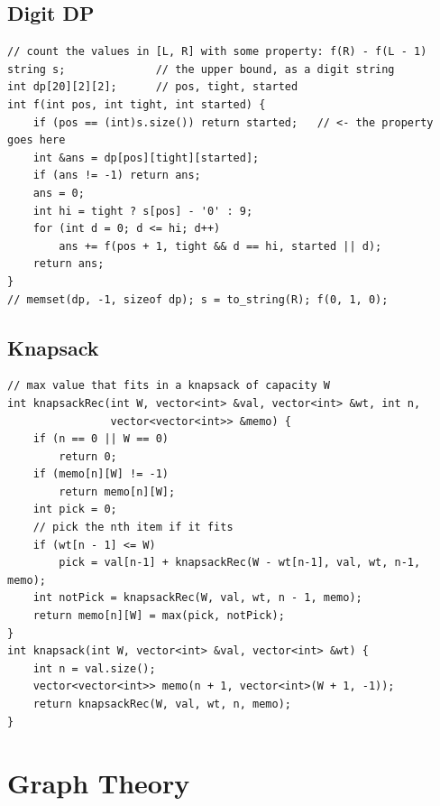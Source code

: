 \subsection{Digit DP}
\begin{lstlisting}
// count the values in [L, R] with some property: f(R) - f(L - 1)
string s;              // the upper bound, as a digit string
int dp[20][2][2];      // pos, tight, started
int f(int pos, int tight, int started) {
    if (pos == (int)s.size()) return started;   // <- the property goes here
    int &ans = dp[pos][tight][started];
    if (ans != -1) return ans;
    ans = 0;
    int hi = tight ? s[pos] - '0' : 9;
    for (int d = 0; d <= hi; d++)
        ans += f(pos + 1, tight && d == hi, started || d);
    return ans;
}
// memset(dp, -1, sizeof dp); s = to_string(R); f(0, 1, 0);
\end{lstlisting}
\subsection{Knapsack}
\begin{lstlisting}
// max value that fits in a knapsack of capacity W
int knapsackRec(int W, vector<int> &val, vector<int> &wt, int n,
                vector<vector<int>> &memo) {
    if (n == 0 || W == 0)
        return 0;
    if (memo[n][W] != -1)
        return memo[n][W];
    int pick = 0;
    // pick the nth item if it fits
    if (wt[n - 1] <= W)
        pick = val[n-1] + knapsackRec(W - wt[n-1], val, wt, n-1, memo);
    int notPick = knapsackRec(W, val, wt, n - 1, memo);
    return memo[n][W] = max(pick, notPick);
}
int knapsack(int W, vector<int> &val, vector<int> &wt) {
    int n = val.size();
    vector<vector<int>> memo(n + 1, vector<int>(W + 1, -1));
    return knapsackRec(W, val, wt, n, memo);
}
\end{lstlisting}
\section{Graph Theory}
